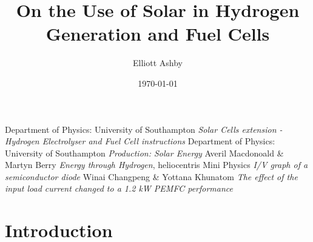 \documentclass{article}
\title{On the Use of Solar in Hydrogen Generation and Fuel Cells}
\author{Elliott Ashby}
\date{\today}
\begin{document}
    \maketitle
    \clearpage
    \tableofcontents
    \begin{thebibliography}{1}
        Department of Physics: University of Southampton \emph{Solar Cells extension - Hydrogen Electrolyser and Fuel Cell instructions}
        Department of Physics: University of Southampton \emph{Production: Solar Energy}
        Averil Macdonoald \& Martyn Berry \emph{Energy through Hydrogen}, heliocentris
        Mini Physics \emph{I/V graph of a semiconductor diode}
        Winai Changpeng \& Yottana Khunatom \emph{The effect of the input load current changed to a 1.2 kW PEMFC performance}
    \end{thebibliography}
    \newpage
    \section{Introduction}
\end{document}

